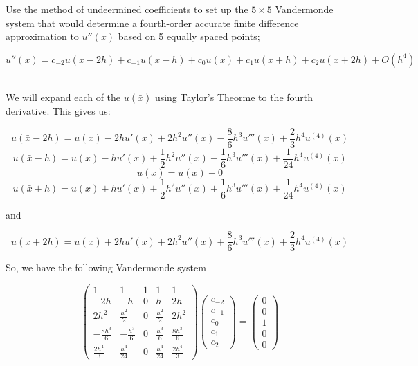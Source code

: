 Use the method of undeermined coefficients to set up the $5\times5$ Vandermonde system that would
determine a fourth-order accurate finite difference approximation to $u''(x)$ based on 5 equally spaced
points;

$$u''(x)=c_{-2}u(x-2h)+c_{-1}u(x-h)+c_0u(x)+c_1u(x+h)+c_2u(x+2h)+O(h^4)$$

\begin{solution}\renewcommand{\qedsymbol}{}\ \\
    We will expand each of the $u(\bar{x})$ using Taylor's Theorme to the fourth derivative. This gives
    us:
    
    $$u(\bar{x}-2h)=u(x)-2hu'(x)+2h^2u''(x)-\frac86h^3u'''(x)+\frac23h^4u^{(4)}(x)$$
    $$u(\bar{x}-h)=u(x)-hu'(x)+\frac12h^2u''(x)-\frac16h^3u'''(x)+\frac{1}{24}h^4u^{(4)}(x)$$
    $$u(\bar{x})=u(x)+0$$
    $$u(\bar{x}+h)=u(x)+hu'(x)+\frac12h^2u''(x)+\frac16h^3u'''(x)+\frac{1}{24}h^4u^{(4)}(x)$$
    
    and
    
    $$u(\bar{x}+2h)=u(x)+2hu'(x)+2h^2u''(x)+\frac86h^3u'''(x)+\frac23h^4u^{(4)}(x)$$

    So, we have the following Vandermonde system
    
    $$\left(\begin{array}{ccccc} 1 & 1 & 1 & 1 &1
                              \\ -2h & -h & 0 & h & 2h
                              \\ 2h^2 & \frac{h^2}{2} & 0 & \frac{h^2}{2} & 2h^2
                              \\ -\frac{8h^3}{6} & -\frac{h^3}{6} & 0 & \frac{h^3}{6} & \frac{8h^3}{6}
                              \\ \frac{2h^4}{3} & \frac{h^4}{24} & 0 & \frac{h^4}{24} & \frac{2h^4}{3} 
      \end{array}\right) 
      \left(\begin{array}{c} c_{-2}\\ c_{-1}\\ c_0\\ c_1\\ c_2 \end{array}\right)
      =\left(\begin{array}{c} 0\\ 0\\ 1\\ 0\\ 0 \end{array}\right)$$
      

\end{solution}
